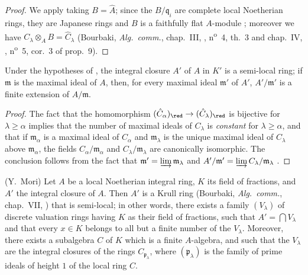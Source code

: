 \begin{proof}
We apply  taking $B=\hat{A}$; since the $B/\mathfrak{q}_i$ are complete local Noetherian rings, they are Japanese rings  and $B$ is a faithfully flat $A$-module ; moreover we have $C_\lambda\otimes_A B=\hat{C}_\lambda$ (Bourbaki, \emph{Alg.~comm.}, chap.~III, , n\textsuperscript{o}~4, th.~3 and chap.~IV, , n\textsuperscript{o}~5, cor.~3 of prop.~9).
\end{proof}

\begin{corollary}[23.2.6]
\label{0.23.2.6}
Under the hypotheses of , the integral closure $A'$ of $A$ in $K'$ is a semi-local ring; if $\mathfrak{m}$ is the maximal ideal of $A$, then, for every maximal ideal $\mathfrak{m}'$ of $A'$, $A'/\mathfrak{m}'$ is a finite extension of $A/\mathfrak{m}$.
\end{corollary}

\begin{proof}
The fact that the homomorphism $(\hat{C}_\alpha)_\red\to(\hat{C}_\lambda)_\red$ is bijective for $\lambda\geq\alpha$ implies that the number of maximal ideals of $C_\lambda$ is \emph{constant} for $\lambda\geq\alpha$, and that if $\mathfrak{m}_\alpha$ is a maximal ideal of $C_\alpha$ and $\mathfrak{m}_\lambda$ is the unique maximal ideal of $C_\lambda$ above $\mathfrak{m}_\alpha$, the fields $C_\alpha/\mathfrak{m}_\alpha$ and $C_\lambda/\mathfrak{m}_\lambda$ are canonically isomorphic.
The conclusion follows from the fact that $\mathfrak{m}'=\varinjlim\mathfrak{m}_\lambda$ and $A'/\mathfrak{m}'=\varinjlim C_\lambda/\mathfrak{m}_\lambda$ .
\end{proof}

\begin{proposition}[23.2.7]
\label{0.23.2.7}
\textnormal{(Y.~Mori)}
Let $A$ be a local Noetherian integral ring, $K$ its field of fractions, and $A'$ the integral closure of $A$.
Then $A'$ is a Krull ring \textnormal{(Bourbaki, \emph{Alg.~comm.}, chap.~VII, )} that is semi-local; in other words, there exists a family $(V_\lambda)$ of discrete valuation rings having $K$ as their field of fractions, such that $A'=\bigcap V_\lambda$ and that every $x\in K$ belongs to all but a finite number of the $V_\lambda$.
Moreover, there exists a subalgebra $C$ of $K$ which is a finite $A$-algebra, and such that the $V_\lambda$ are the integral closures of the rings $C_{\mathfrak{p}_\lambda}$, where $(\mathfrak{p}_\lambda)$ is the family of prime ideals of height $1$ of the local ring $C$.
\end{proposition}

